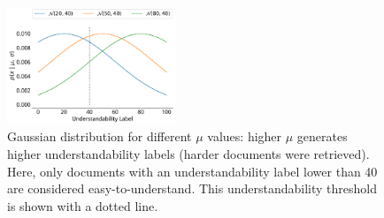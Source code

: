%
%

\begin{figure}[t!]
  \centering
   \includegraphics[width=0.45\textwidth]{figs/gaussians}
    \caption{Gaussian distribution for different $\mu$ values: higher $\mu$ generates higher understandability labels (harder documents were retrieved). Here, only documents with an understandability label lower than 40 are considered easy-to-understand. This understandability threshold is shown with a dotted line.}
  \label{fig:gaussians}
\end{figure}



